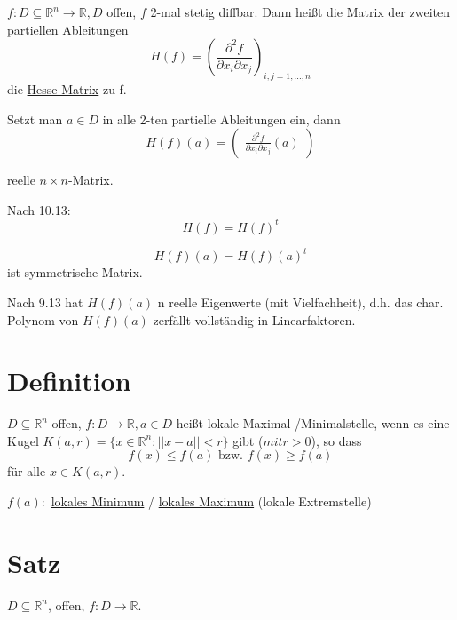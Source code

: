 \documentclass[a4paper, openany]{book}
\begin{document}
          $f: D \subseteq \mathbb{R}^n \rightarrow \mathbb{R}, D$ offen, $f$ 2-mal stetig diffbar. Dann heißt die Matrix der zweiten partiellen Ableitungen \[ H(f) = (\frac{\partial^2 f}{\partial x_i \partial x_j})_{i,j=1,...,n} \] die \underline{Hesse-Matrix} zu f.

          Setzt man $a \in D$ in alle 2-ten partielle Ableitungen ein, dann \[ H(f)(a) = \begin{pmatrix}\frac{\partial^2 f}{\partial x_i \partial x_j}(a) \end{pmatrix} \]

          reelle $n \times n$-Matrix.

          \par \medskip

          Nach 10.13: \[ H(f) = H(f)^t \]

          \[ H(f)(a) = H(f)(a)^t \] ist symmetrische Matrix.

          \par \medskip

          Nach 9.13 hat $H(f)(a)$ n reelle Eigenwerte (mit Vielfachheit), d.h. das char. Polynom von $H(f)(a)$ zerfällt vollständig in Linearfaktoren.

          \section{Definition}

          $D \subseteq \mathbb{R}^n$ offen, $f: D \rightarrow \mathbb{R}, a \in D$ heißt lokale Maximal-/Minimalstelle, wenn es eine Kugel $K(a, r) = \{x \in \mathbb{R}^n : ||x-a|| < r \}$ gibt ($mit r > 0$), so dass \[ f(x) \le f(a) \text{ bzw. } f(x) \ge f(a) \] für alle $x \in K(a,r)$.

          \par \medskip

          $f(a):$ \underline{lokales Minimum} / \underline{lokales Maximum} (lokale Extremstelle)

          \section{Satz}

          $D \subseteq \mathbb{R}^n$, offen, $f: D \rightarrow \mathbb{R}$.
\end{document}

